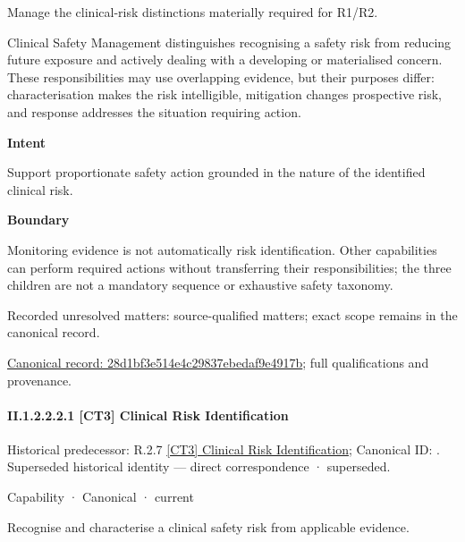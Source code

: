 Manage the clinical-risk distinctions materially required for R1/R2.



Clinical Safety Management distinguishes recognising a safety risk from reducing future exposure and actively dealing with a developing or materialised concern. These responsibilities may use overlapping evidence, but their purposes differ: characterisation makes the risk intelligible, mitigation changes prospective risk, and response addresses the situation requiring action.



\textbf{Intent}



Support proportionate safety action grounded in the nature of the identified clinical risk.



\textbf{Boundary}



Monitoring evidence is not automatically risk identification. Other capabilities can perform required actions without transferring their responsibilities; the three children are not a mandatory sequence or exhaustive safety taxonomy.


{\small Recorded unresolved matters: source-qualified matters; exact scope remains in the canonical record.}\par
{\footnotesize \href{../../../../continuum/strategy/capability/28d1bf3e514e4c29837ebedaf9e4917b.md}{Canonical record: 28d1bf3e514e4c29837ebedaf9e4917b}; full qualifications and provenance.}\par
\paragraph*{II.1.2.2.2.1 [CT3] Clinical Risk Identification}
\label{navigation:II.1.2.2.2.1}

{\small Historical predecessor: R.2.7 \hyperref[element:690da55f1f5b4c44ba58cf67a717a564]{[CT3] Clinical Risk Identification}; Canonical ID: \texttt{}. Superseded historical identity — direct correspondence · superseded.}\par
\label{element:d54c19c6efaf42af82ad71a4142149d4}
{\small Capability · Canonical · current}\par

Recognise and characterise a clinical safety risk from applicable evidence.



